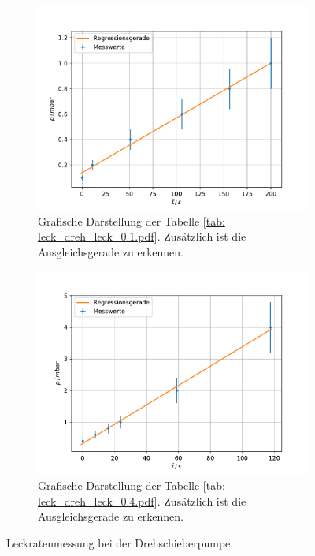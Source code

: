 \begin{figure}
    \centering
    \begin{subfigure}{0.4\textwidth}
        \centering
        \includegraphics[width=1\textwidth]{../Messdaten/plots/dreh/leckrate_dreh_01.pdf}
        \caption{Grafische Darstellung der Tabelle \ref{tab: leck_dreh_leck_0.1.pdf}. Zusätzlich ist die Ausgleichsgerade zu erkennen.}
        \label{fig: drehs_leck_1}
    \end{subfigure}
    \begin{subfigure}{0.4\textwidth}
        \centering
        \includegraphics[width=1\textwidth]{../Messdaten/plots/dreh/leckrate_dreh_04.pdf}
        \caption{Grafische Darstellung der Tabelle \ref{tab: leck_dreh_leck_0.4.pdf}. Zusätzlich ist die Ausgleichsgerade zu erkennen.}
    \end{subfigure}
    \caption{Leckratenmessung bei der Drehschieberpumpe.}
      \label{fig: leck_dreh_1}
\end{figure}

